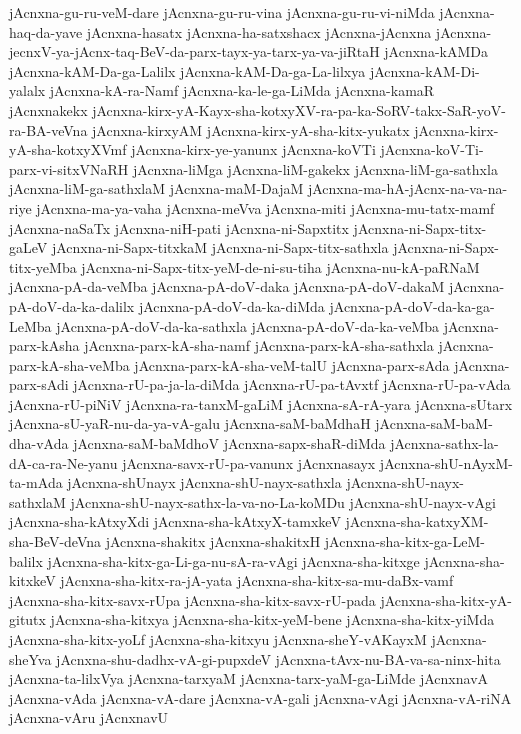 {jAcnxna-gu-ru-veM-dare
jAcnxna-gu-ru-vina
jAcnxna-gu-ru-vi-niMda
jAcnxna-haq-da-yave
jAcnxna-hasatx
jAcnxna-ha-satxshacx
jAcnxna-jAcnxna
jAcnxna-jecnxV-ya-jAcnx-taq-BeV-da-parx-tayx-ya-tarx-ya-va-jiRtaH
jAcnxna-kAMDa
jAcnxna-kAM-Da-ga-Lalilx
jAcnxna-kAM-Da-ga-La-lilxya
jAcnxna-kAM-Di-yalalx
jAcnxna-kA-ra-Namf
jAcnxna-ka-le-ga-LiMda
jAcnxna-kamaR
jAcnxnakekx
jAcnxna-kirx-yA-Kayx-sha-kotxyXV-ra-pa-ka-SoRV-takx-SaR-yoV-ra-BA-veVna
jAcnxna-kirxyAM
jAcnxna-kirx-yA-sha-kitx-yukatx
jAcnxna-kirx-yA-sha-kotxyXVmf
jAcnxna-kirx-ye-yanunx
jAcnxna-koVTi
jAcnxna-koV-Ti-parx-vi-sitxVNaRH
jAcnxna-liMga
jAcnxna-liM-gakekx
jAcnxna-liM-ga-sathxla
jAcnxna-liM-ga-sathxlaM
jAcnxna-maM-DajaM
jAcnxna-ma-hA-jAcnx-na-va-na-riye
jAcnxna-ma-ya-vaha
jAcnxna-meVva
jAcnxna-miti
jAcnxna-mu-tatx-mamf
jAcnxna-naSaTx
jAcnxna-niH-pati
jAcnxna-ni-Sapxtitx
jAcnxna-ni-Sapx-titx-gaLeV
jAcnxna-ni-Sapx-titxkaM
jAcnxna-ni-Sapx-titx-sathxla
jAcnxna-ni-Sapx-titx-yeMba
jAcnxna-ni-Sapx-titx-yeM-de-ni-su-tiha
jAcnxna-nu-kA-paRNaM
jAcnxna-pA-da-veMba
jAcnxna-pA-doV-daka
jAcnxna-pA-doV-dakaM
jAcnxna-pA-doV-da-ka-dalilx
jAcnxna-pA-doV-da-ka-diMda
jAcnxna-pA-doV-da-ka-ga-LeMba
jAcnxna-pA-doV-da-ka-sathxla
jAcnxna-pA-doV-da-ka-veMba
jAcnxna-parx-kAsha
jAcnxna-parx-kA-sha-namf
jAcnxna-parx-kA-sha-sathxla
jAcnxna-parx-kA-sha-veMba
jAcnxna-parx-kA-sha-veM-talU
jAcnxna-parx-sAda
jAcnxna-parx-sAdi
jAcnxna-rU-pa-ja-la-diMda
jAcnxna-rU-pa-tAvxtf
jAcnxna-rU-pa-vAda
jAcnxna-rU-piNiV
jAcnxna-ra-tanxM-gaLiM
jAcnxna-sA-rA-yara
jAcnxna-sUtarx
jAcnxna-sU-yaR-nu-da-ya-vA-galu
jAcnxna-saM-baMdhaH
jAcnxna-saM-baM-dha-vAda
jAcnxna-saM-baMdhoV
jAcnxna-sapx-shaR-diMda
jAcnxna-sathx-la-dA-ca-ra-Ne-yanu
jAcnxna-savx-rU-pa-vanunx
jAcnxnasayx
jAcnxna-shU-nAyxM-ta-mAda
jAcnxna-shUnayx
jAcnxna-shU-nayx-sathxla
jAcnxna-shU-nayx-sathxlaM
jAcnxna-shU-nayx-sathx-la-va-no-La-koMDu
jAcnxna-shU-nayx-vAgi
jAcnxna-sha-kAtxyXdi
jAcnxna-sha-kAtxyX-tamxkeV
jAcnxna-sha-katxyXM-sha-BeV-deVna
jAcnxna-shakitx
jAcnxna-shakitxH
jAcnxna-sha-kitx-ga-LeM-balilx
jAcnxna-sha-kitx-ga-Li-ga-nu-sA-ra-vAgi
jAcnxna-sha-kitxge
jAcnxna-sha-kitxkeV
jAcnxna-sha-kitx-ra-jA-yata
jAcnxna-sha-kitx-sa-mu-daBx-vamf
jAcnxna-sha-kitx-savx-rUpa
jAcnxna-sha-kitx-savx-rU-pada
jAcnxna-sha-kitx-yA-gitutx
jAcnxna-sha-kitxya
jAcnxna-sha-kitx-yeM-bene
jAcnxna-sha-kitx-yiMda
jAcnxna-sha-kitx-yoLf
jAcnxna-sha-kitxyu
jAcnxna-sheY-vAKayxM
jAcnxna-sheYva
jAcnxna-shu-dadhx-vA-gi-pupxdeV
jAcnxna-tAvx-nu-BA-va-sa-ninx-hita
jAcnxna-ta-lilxVya
jAcnxna-tarxyaM
jAcnxna-tarx-yaM-ga-LiMde
jAcnxnavA
jAcnxna-vAda
jAcnxna-vA-dare
jAcnxna-vA-gali
jAcnxna-vAgi
jAcnxna-vA-riNA
jAcnxna-vAru
jAcnxnavU
}
